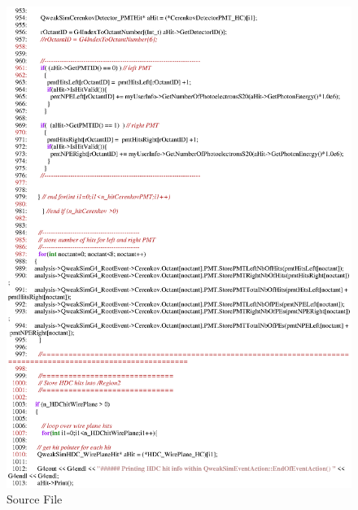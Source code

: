 \begin{figure}[h]
  \hspace{0cm}
  \includegraphics[scale=0.8]{./figures13/QweakSimEventAction.cc-p17.eps}
  \caption{Source File}
           \label{fig:XIII-SC-32}
\end{figure}

\clearpage

